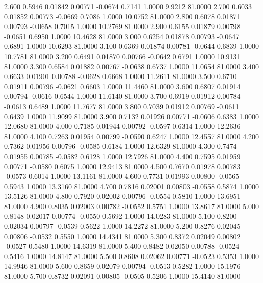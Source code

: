    2.600   0.5946   0.01842   0.00771  -0.0674   0.7141   1.0000   9.9212  81.0000
   2.700   0.6033   0.01852   0.00773  -0.0669   0.7086   1.0000  10.0752  81.0000
   2.800   0.6078   0.01871   0.00793  -0.0658   0.7015   1.0000  10.2769  81.0000
   2.900   0.6155   0.01879   0.00798  -0.0651   0.6950   1.0000  10.4628  81.0000
   3.000   0.6254   0.01878   0.00793  -0.0647   0.6891   1.0000  10.6293  81.0000
   3.100   0.6369   0.01874   0.00781  -0.0644   0.6839   1.0000  10.7781  81.0000
   3.200   0.6491   0.01870   0.00766  -0.0642   0.6791   1.0000  10.9131  81.0000
   3.300   0.6584   0.01882   0.00767  -0.0638   0.6737   1.0000  11.0654  81.0000
   3.400   0.6633   0.01901   0.00788  -0.0628   0.6668   1.0000  11.2611  81.0000
   3.500   0.6710   0.01911   0.00796  -0.0621   0.6603   1.0000  11.4460  81.0000
   3.600   0.6807   0.01914   0.00794  -0.0616   0.6544   1.0000  11.6140  81.0000
   3.700   0.6919   0.01912   0.00784  -0.0613   0.6489   1.0000  11.7677  81.0000
   3.800   0.7039   0.01912   0.00769  -0.0611   0.6439   1.0000  11.9099  81.0000
   3.900   0.7132   0.01926   0.00771  -0.0606   0.6383   1.0000  12.0680  81.0000
   4.000   0.7185   0.01944   0.00792  -0.0597   0.6314   1.0000  12.2636  81.0000
   4.100   0.7263   0.01954   0.00799  -0.0590   0.6247   1.0000  12.4557  81.0000
   4.200   0.7362   0.01956   0.00796  -0.0585   0.6184   1.0000  12.6329  81.0000
   4.300   0.7474   0.01955   0.00785  -0.0582   0.6128   1.0000  12.7926  81.0000
   4.400   0.7595   0.01959   0.00771  -0.0580   0.6075   1.0000  12.9413  81.0000
   4.500   0.7670   0.01978   0.00783  -0.0573   0.6014   1.0000  13.1161  81.0000
   4.600   0.7731   0.01993   0.00800  -0.0565   0.5943   1.0000  13.3160  81.0000
   4.700   0.7816   0.02001   0.00803  -0.0558   0.5874   1.0000  13.5126  81.0000
   4.800   0.7920   0.02002   0.00796  -0.0554   0.5810   1.0000  13.6951  81.0000
   4.900   0.8035   0.02003   0.00782  -0.0552   0.5751   1.0000  13.8617  81.0000
   5.000   0.8148   0.02017   0.00774  -0.0550   0.5692   1.0000  14.0283  81.0000
   5.100   0.8200   0.02034   0.00797  -0.0539   0.5622   1.0000  14.2272  81.0000
   5.200   0.8276   0.02045   0.00806  -0.0532   0.5550   1.0000  14.4341  81.0000
   5.300   0.8372   0.02049   0.00802  -0.0527   0.5480   1.0000  14.6319  81.0000
   5.400   0.8482   0.02050   0.00788  -0.0524   0.5416   1.0000  14.8147  81.0000
   5.500   0.8608   0.02062   0.00771  -0.0523   0.5353   1.0000  14.9946  81.0000
   5.600   0.8659   0.02079   0.00794  -0.0513   0.5282   1.0000  15.1976  81.0000
   5.700   0.8732   0.02091   0.00805  -0.0505   0.5206   1.0000  15.4140  81.0000
